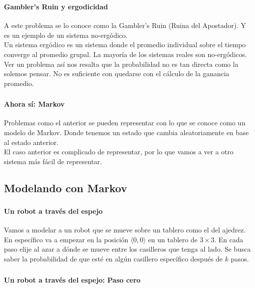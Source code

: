 \documentclass[../main.tex]{subfiles}
\begin{document}
\begin{frame}
  \frametitle{\SECTIONC}
  \framesubtitle{Gambler's Ruin y ergodicidad}

  A este problema se lo conoce como la Gambler's Ruin (Ruina del Apostador). Y es un ejemplo de un sistema no-ergódico. \pause \\
  Un sistema ergódico es un sistema donde el promedio individual sobre el tiempo converge al promedio grupal. \pause La mayoría de los sistemas reales son no-ergódicos. \pause \\
  Ver un problema así nos resalta que la probabilidad no es tan directa como la solemos pensar. No es suficiente con quedarse con el cálculo de la ganancia promedio.
\end{frame}

\begin{frame}
  \frametitle{\SECTIONC}
  \framesubtitle{Ahora sí: Markov}

  Problemas como el anterior se pueden representar con lo que se conoce como un modelo de Markov. Donde tenemos un estado que cambia aleatoriamente en base al estado anterior. \pause \\
  El caso anterior es complicado de representar, por lo que vamos a ver a otro sistema más fácil de representar.

\end{frame}

\subsection{Modelando con Markov}
\newcommand{\EJC}{Un robot a través del espejo}

\begin{frame}
  \frametitle{\SECTIONC}
  \framesubtitle{\EJC}

  Vamos a modelar a un robot que se mueve sobre un tablero como el del ajedrez. \pause En específico va a empezar en la posición \(\langle 0, 0 \rangle\) en un tablero de \(3 \times 3\). En cada paso elije al azar a dónde se mueve entre los casilleros que tenga al lado. Se busca saber la probabilidad de que esté en algún casillero específico después de \(k\) pasos.

  \begin{figure}[H]
    \centering
  \end{figure}
\end{frame}

\begin{frame}
  \frametitle{\SECTIONC}
  \framesubtitle{\EJC: Paso cero}

  \begin{figure}[H]
    \centering
  \end{figure}
\end{frame}
\end{document}
